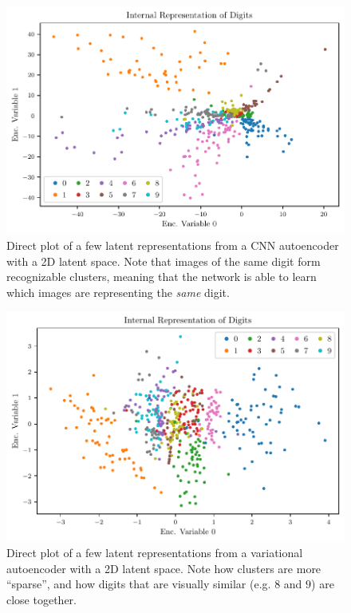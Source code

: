 \documentclass[11pt,a4paper]{scrartcl}
\newcommand{\q}[1]{``#1''}
\begin{document}
\begin{figure}[htp]
    \centering
    \includegraphics[width=.9\textwidth]{../Code/Plots/2d_encoded_space}
    \caption{Direct plot of a few latent representations from a CNN autoencoder with a 2D latent space. Note that images of the same digit form recognizable clusters, meaning that the network is able to learn which images are representing the \textit{same} digit.\label{fig:2d_encoded_space}}
\end{figure}

\begin{figure}[htp]
    \centering
    \includegraphics[width=.9\textwidth]{../Code/Plots/2d_encoded_space_vae}
    \caption{Direct plot of a few latent representations from a variational autoencoder with a 2D latent space. Note how clusters are more \q{sparse}, and how digits that are visually similar (e.g. $8$ and $9$) are close together.\label{fig:2d_encoded_space_vae}}
\end{figure}
\end{document}
